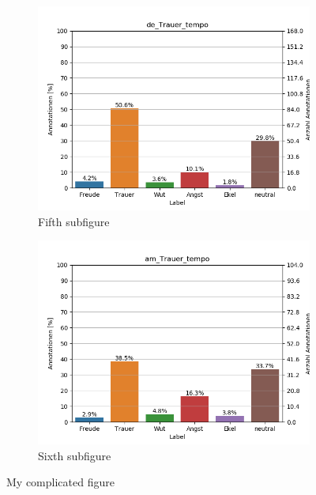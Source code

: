 \documentclass[11pt,a4paper,headsepline,twoside,toc=bibliography]{scrreprt}
\begin{document}
\begin{figure}[t!]
	\medskip
	\begin{subfigure}{0.48\textwidth}
		\includegraphics[width=\linewidth]{plots/de_Trauer_tempo.png}
		\caption{Fifth subfigure} \label{fig:de_T_tempo}
	\end{subfigure}\hspace*{\fill}
	\begin{subfigure}{0.48\textwidth}
		\includegraphics[width=\linewidth]{plots/am_Trauer_tempo.png}
		\caption{Sixth subfigure} \label{fig:am_T_tempo}
	\end{subfigure}
	
	\caption{My complicated figure} \label{fig:countplots_T}
\end{figure}
\end{document}
